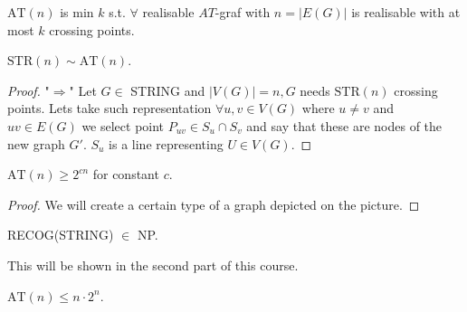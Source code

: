 \begin{defn}
	$\text{AT}(n)$ is min $k$ s.t. $\forall$ realisable $AT$-graf with $n = |E(G)|$ is realisable with at most $k$ crossing points.
\end{defn}

\begin{thm}
	$\text{STR}(n) \sim \text{AT}(n)$.
\end{thm}

\begin{proof}
	"$\Rightarrow$" Let $G \in$ STRING and $|V(G)| = n, G$ needs $\text{STR}(n)$ crossing points. Lets take such representation $\forall u,v \in V(G)$ where $u \neq v$ and $uv \in E(G)$ we select point $P_{uv} \in S_u \cap S_v$ and say that these are nodes of the new graph $G'$. $S_u$ is a line representing $U \in V(G)$.
	
\end{proof}

\begin{thm}
	$\text{AT}(n) \geq 2^{cn}$ for constant $c$.
\end{thm}

\begin{proof}
	We will create a certain type of a graph depicted on the picture. %
	
\end{proof}

\begin{thm}
	RECOG(STRING) $\in$ NP.
\end{thm}

This will be shown in the second part of this course.

\begin{thm}
	$\text{AT}(n) \leq n \cdot 2^n$.
\end{thm}

